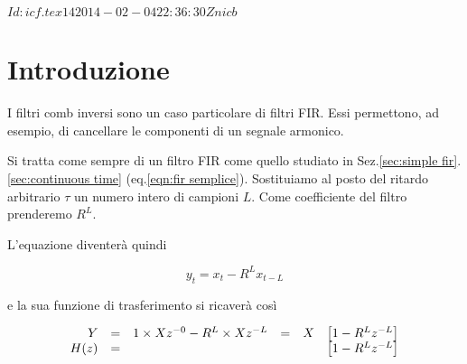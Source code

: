 %
%
%
\svnInfo $Id: icf.tex 14 2014-02-04 22:36:30Z nicb $

\section{Introduzione\label{sec:icf introduction}}

I filtri comb inversi sono un caso particolare di filtri FIR. Essi permettono,
ad esempio, di cancellare le componenti di un segnale armonico.

Si tratta come sempre di un filtro FIR come quello studiato in
Sez.\ref{sec:simple fir}.\vref{sec:continuous time}  (eq.\ref{eqn:fir
semplice}). Sostituiamo al posto del ritardo arbitrario $\tau$ un numero
intero di campioni $L$. Come coefficiente del filtro prenderemo $R^{L}$.

L'equazione diventer\`a quindi

\begin{equation}\label{eqn:icf 1}
		y_t = x_t - R^{L} x_{t - L}
\end{equation}

e la sua funzione di trasferimento si ricaver\`a cos\`i

\begin{equation}\label{eqn: icf 1 tf}
  \begin{array}{r c l c c l}
	Y & = & 1 \times X z^{-0} - R^{L} \times X z^{-L} & = & X & \left [ 1 - R^{L} z^{-L} \right ]\\ 
	H ( z ) & = &                                     &   &   & \left [ 1 - R^{L} z^{-L} \right ]\\
	\end{array}
\end{equation}

